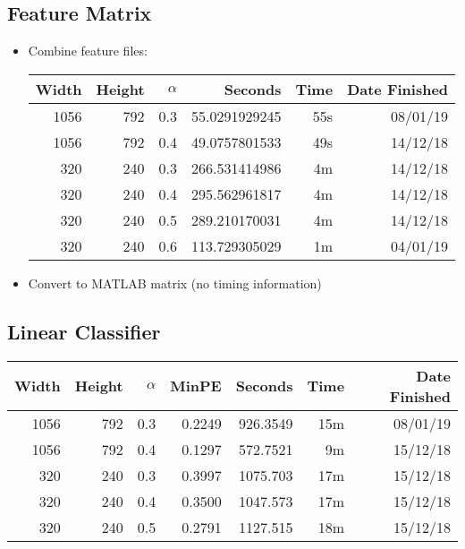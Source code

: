 \subsection{Feature Matrix}
\begin{itemize}
  \item Combine feature files:
  \begin{center}
  \begin{tabular}{ r r | r | r r r }
  Width & Height & $\alpha$ & Seconds & Time & Date Finished \\ \hline
  1056 & 792 & 0.3 & 55.0291929245 & 55s & 08/01/19 \\
  1056 & 792 & 0.4 & 49.0757801533 & 49s & 14/12/18 \\
  320 & 240 & 0.3 & 266.531414986 & 4m & 14/12/18 \\
  320 & 240 & 0.4 & 295.562961817 & 4m & 14/12/18 \\
  320 & 240 & 0.5 & 289.210170031 & 4m & 14/12/18 \\
  320 & 240 & 0.6 & 113.729305029 & 1m & 04/01/19 \\
  \end{tabular}
  \end{center}

  \item Convert to MATLAB matrix (no timing information)
\end{itemize}

\subsection{Linear Classifier}
  \begin{center}
  \begin{tabular}{ r r | r | r | r r r }
  Width & Height & $\alpha$ & MinPE & Seconds & Time & Date Finished \\ \hline
  1056 & 792 & 0.3 & 0.2249 & 926.3549 & 15m & 08/01/19 \\
  1056 & 792 & 0.4 & 0.1297 & 572.7521 & 9m & 15/12/18 \\
  320 & 240 & 0.3 & 0.3997 & 1075.703 & 17m & 15/12/18 \\
  320 & 240 & 0.4 & 0.3500 & 1047.573 & 17m & 15/12/18 \\
  320 & 240 & 0.5 & 0.2791 & 1127.515 & 18m & 15/12/18 \\
  \end{tabular}
  \end{center}